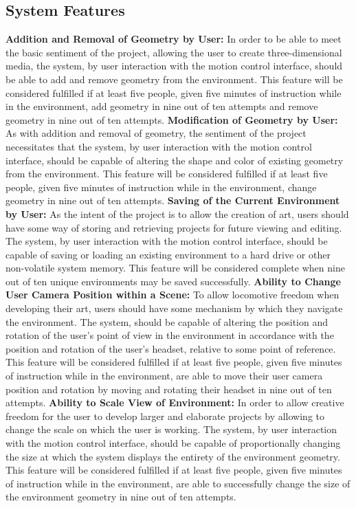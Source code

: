 \documentclass[onecolumn, draftclsnofoot,10pt, compsoc]{IEEEtran}
\begin{document}
\subsection{System Features} 
\textbf{Addition and Removal of Geometry by User:}
\newline
In order to be able to meet the basic sentiment of the project, allowing the user to create three-dimensional media, the system, by user interaction with the motion control interface, should be able to add and remove geometry from the environment. This feature will be considered fulfilled if at least five people, given five minutes of instruction while in the environment, add geometry in nine out of ten attempts and remove geometry in nine out of ten attempts.
\newline 
\textbf{Modification of Geometry by User:}
\newline
As with addition and removal of geometry, the sentiment of the project necessitates that the system, by user interaction with the motion control interface, should be capable of altering the shape and color of existing geometry from the environment. This feature will be considered fulfilled if at least five people, given five minutes of instruction while in the environment, change geometry in nine out of ten attempts.
\newline 
\textbf{Saving of the Current Environment by User:}
\newline
As the intent of the project is to allow the creation of art, users should have some way of storing and retrieving projects for future viewing and editing. The system, by user interaction with the motion control interface, should be capable of saving or loading an existing environment to a hard drive or other non-volatile system memory. This feature will be considered complete when nine out of ten unique environments may be saved successfully.
\newline 
\textbf{Ability to Change User Camera Position within a Scene:}
\newline
To allow locomotive freedom when developing their art, users should have some mechanism by which they navigate the environment. The system, should be capable of altering the position and rotation of the user's point of view in the environment in accordance with the position and rotation of the user's headset, relative to some point of reference. This feature will be considered fulfilled if at least five people, given five minutes of instruction while in the environment, are able to move their user camera position and rotation by moving and rotating their headset in nine out of ten attempts.
\newline 
\textbf{Ability to Scale View of Environment:}
\newline
In order to allow creative freedom for the user to develop larger and elaborate projects by allowing to change the scale on which the user is working. The system, by user interaction with the motion control interface, should be capable of proportionally changing the size at which the system displays the entirety of the environment geometry. This feature will be considered fulfilled if at least five people, given five minutes of instruction while in the environment, are able to successfully change the size of the environment geometry in nine out of ten attempts.
\end{document}
